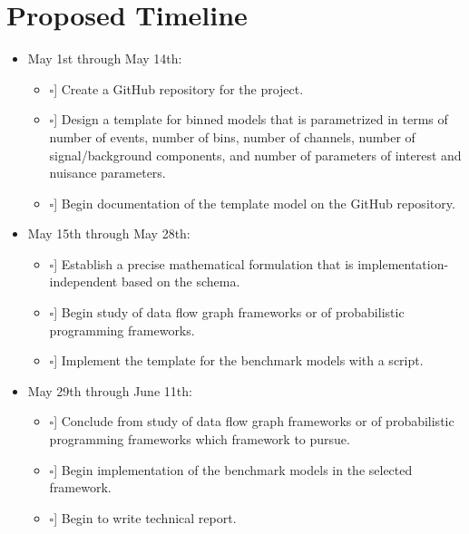 \newcommand{\checkedBox}{\makebox[0pt][l]{$\square$}\raisebox{.15ex}{\hspace{0.1em}$\checkmark$}}
\newcommand{\uncheckedBox}{\makebox[0pt][l]{$\square$}\raisebox{.15ex}{\hspace{0.1em}\phantom{$\checkmark$}}}

\section{Proposed Timeline}

\begin{itemize}
	\item May 1st through May 14th:
	      \begin{itemize}
	      	\item [\uncheckedBox] Create a GitHub repository for the project.
	      	\item [\uncheckedBox] Design a template for binned models that is parametrized in terms of number of events, number of bins, number of channels, number of signal/background components, and number of parameters of interest and nuisance parameters.
	      	\item [\uncheckedBox] Begin documentation of the template model on the GitHub repository.
	      \end{itemize}
	\item May 15th through May 28th:
	      \begin{itemize}
	      	\item [\uncheckedBox] Establish a precise mathematical formulation that is implementation-independent based on the  schema.
	      	\item [\uncheckedBox] Begin study of data flow graph frameworks or of probabilistic programming frameworks.
	      	\item [\uncheckedBox] Implement the template for the benchmark models with a  script.
	      \end{itemize}
	\item May 29th through June 11th:
	      \begin{itemize}
	      	\item [\uncheckedBox] Conclude from study of data flow graph frameworks or of probabilistic programming frameworks which framework to pursue.
	      	\item [\uncheckedBox] Begin implementation of the benchmark models in the selected framework.
	      	\item [\uncheckedBox] Begin to write technical report.

\end{itemize}
\end{itemize}
